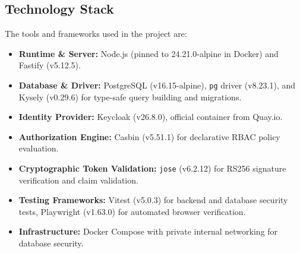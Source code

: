 \documentclass{article}
\begin{document}
\subsection*{Technology Stack}
The tools and frameworks used in the project are:
\begin{itemize}
    \item \textbf{Runtime \& Server:} Node.js (pinned to 24.21.0-alpine in Docker) and Fastify (v5.12.5).
    \item \textbf{Database \& Driver:} PostgreSQL (v16.15-alpine), \texttt{pg} driver (v8.23.1), and Kysely (v0.29.6) for type-safe query building and migrations.
    \item \textbf{Identity Provider:} Keycloak (v26.8.0), official container from Quay.io.
    \item \textbf{Authorization Engine:} Casbin (v5.51.1) for declarative RBAC policy evaluation.
    \item \textbf{Cryptographic Token Validation:} \texttt{jose} (v6.2.12) for RS256 signature verification and claim validation.
    \item \textbf{Testing Frameworks:} Vitest (v5.0.3) for backend and database security tests, Playwright (v1.63.0) for automated browser verification.
    \item \textbf{Infrastructure:} Docker Compose with private internal networking for database security.
\end{itemize}
\end{document}
